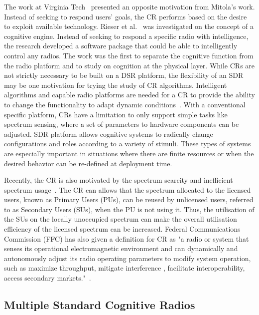 The work at Virginia Tech~\cite{MacKenzie2009} presented an opposite motivation from Mitola’s work. Instead of seeking to respond users’ goals, the CR performs based on the desire
to exploit available technology. Rieser et al.~\cite{Rieser2007,Rondeau2004} was investigated on the concept of a cognitive engine. Instead of seeking to respond a specific radio with intelligence, the research
developed a software package that could be able to intelligently control any radios. The work was the first to separate the cognitive function from the radio platform and to study on cognition at the physical layer.
While CRs are not strictly necessary to be built on a DSR platform, the flexibility of an SDR may be one motivation for trying the study of CR algorithms. 
Intelligent algorithms and capable radio platforms are needed for a CR to provide the ability to change the functionality to adapt dynamic conditions~\cite{MacKenzie2009}.
With a conventional specific platform, CRs have a limitation to only support simple tasks like spectrum sensing, where a set of parameters to hardware components can be adjusted. SDR platform allows cognitive systems to radically change configurations and roles according to a variety of stimuli. These types of systems are especially important in situations where there are finite resources or when the desired behavior can be re-defined at deployment time.

Recently, the CR is also motivated by the spectrum scarcity and inefficient spectrum usage~\cite{FCC2002,Ghasemi2008}. The CR can allows that the spectrum allocated to the licensed users, known as Primary Users (PUs), can be reused by unlicensed users, referred to as Secondary Users (SUs), when the PU is not using it. Thus, the utilisation of the SUs on the locally unoccupied spectrum can make the overall utilisation efficiency of the licensed spectrum can be increased. Federal Communications Commission (FFC) has also given a definition for CR as "a radio or system that senses its operational electromagnetic environment and can dynamically and autonomously adjust its radio operating parameters to modify system operation, such as maximize throughput, mitigate interference , facilitate interoperability, access secondary markets."~\cite{FCC2005}.

\subsection{Multiple Standard Cognitive Radios}

